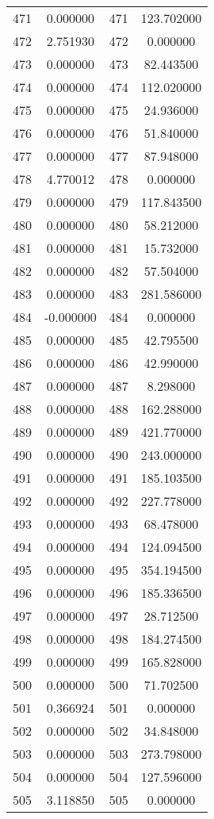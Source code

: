 \documentclass[12pt]{article}
\begin{document}
\begin{longtable}{@{}cccc@{}}
471 & 0.000000 & 471 & 123.702000 \\
472 & 2.751930 & 472 & 0.000000 \\
473 & 0.000000 & 473 & 82.443500 \\
474 & 0.000000 & 474 & 112.020000 \\
475 & 0.000000 & 475 & 24.936000 \\
476 & 0.000000 & 476 & 51.840000 \\
477 & 0.000000 & 477 & 87.948000 \\
478 & 4.770012 & 478 & 0.000000 \\
479 & 0.000000 & 479 & 117.843500 \\
480 & 0.000000 & 480 & 58.212000 \\
481 & 0.000000 & 481 & 15.732000 \\
482 & 0.000000 & 482 & 57.504000 \\
483 & 0.000000 & 483 & 281.586000 \\
484 & -0.000000 & 484 & 0.000000 \\
485 & 0.000000 & 485 & 42.795500 \\
486 & 0.000000 & 486 & 42.990000 \\
487 & 0.000000 & 487 & 8.298000 \\
488 & 0.000000 & 488 & 162.288000 \\
489 & 0.000000 & 489 & 421.770000 \\
490 & 0.000000 & 490 & 243.000000 \\
491 & 0.000000 & 491 & 185.103500 \\
492 & 0.000000 & 492 & 227.778000 \\
493 & 0.000000 & 493 & 68.478000 \\
494 & 0.000000 & 494 & 124.094500 \\
495 & 0.000000 & 495 & 354.194500 \\
496 & 0.000000 & 496 & 185.336500 \\
497 & 0.000000 & 497 & 28.712500 \\
498 & 0.000000 & 498 & 184.274500 \\
499 & 0.000000 & 499 & 165.828000 \\
500 & 0.000000 & 500 & 71.702500 \\
501 & 0.366924 & 501 & 0.000000 \\
502 & 0.000000 & 502 & 34.848000 \\
503 & 0.000000 & 503 & 273.798000 \\
504 & 0.000000 & 504 & 127.596000 \\
505 & 3.118850 & 505 & 0.000000 \\

\end{longtable}
\end{document}
